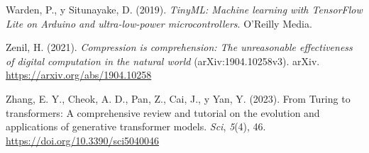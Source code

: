 \documentclass[12pt,letterpaper,oneside]{article}
\newenvironment{referencias}
  {\begin{list}{}{%
      \setlength{\leftmargin}{1.25cm}%
      \setlength{\itemindent}{-1.25cm}%
      \setlength{\itemsep}{0.6em}%
      \setlength{\parsep}{0pt}}%
   \setstretch{1.1}}
  {\end{list}}
\begin{document}
\begin{referencias}
\item Warden, P., y Situnayake, D. (2019). \textit{TinyML: Machine learning with TensorFlow Lite on Arduino and ultra-low-power microcontrollers}. O'Reilly Media.

\item Zenil, H. (2021). \textit{Compression is comprehension: The unreasonable effectiveness of digital computation in the natural world} (arXiv:1904.10258v3). arXiv. \url{https://arxiv.org/abs/1904.10258}

\item Zhang, E. Y., Cheok, A. D., Pan, Z., Cai, J., y Yan, Y. (2023). From Turing to transformers: A comprehensive review and tutorial on the evolution and applications of generative transformer models. \textit{Sci}, \textit{5}(4), 46. \url{https://doi.org/10.3390/sci5040046}

\end{referencias}
\end{document}
